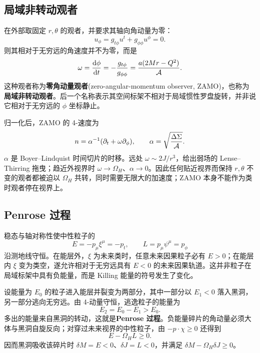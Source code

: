 \subsection{局域非转动观者}

在外部取固定 $r,\theta$ 的观者，并要求其轴向角动量为零：
\[
    u_\phi=g_{t\phi}u^t+g_{\phi\phi}u^\phi=0.
\]
则其相对于无穷远的角速度并不为零，而是
\begin{equation}\label{eq:kn-zamo-omega}
    \omega=\frac{\dd\phi}{\dd t}
      =-\frac{g_{t\phi}}{g_{\phi\phi}}
      =\frac{a(2Mr-Q^2)}{\mathcal A}.
\end{equation}
这种观者称为\textbf{零角动量观者}(zero-angular-momentum observer, ZAMO)，也称为\textbf{局域非转动观者}。后一个名称表示其空间标架不相对于局域惯性罗盘旋转，并非说它相对于无穷远的 $\phi$ 坐标静止。

归一化后，ZAMO 的 4-速度为
\begin{equation}\label{eq:kn-zamo}
    n=\alpha^{-1}(\partial_t+\omega\partial_\phi),
    \qquad
    \alpha=\sqrt{\frac{\Delta\Sigma}{\mathcal A}}.
\end{equation}
$\alpha$ 是 Boyer--Lindquist 时间切片的时移。远处 $\omega\sim2J/r^3$，给出弱场的 Lense--Thirring 拖曳；趋近外视界时 $\omega\to\Omega_H$、$\alpha\to0$。因此任何贴近视界而保持 $r,\theta$ 不变的观者都被迫以 $\Omega_H$ 共转，同时需要无限大的加速度；ZAMO 本身不能作为类时观者停在视界上。

\subsection{Penrose 过程}

稳态与轴对称性使中性粒子的
\[
    E=-p_\mu\xi^\mu=-p_t,
    \qquad L=p_\mu\psi^\mu=p_\phi
\]
沿测地线守恒。在能层外，$\xi$ 为未来类时，任意未来因果粒子必有 $E>0$；在能层内 $\xi$ 变为类空，遂允许相对于无穷远具有 $E<0$ 的未来因果轨道。这并非粒子在局域标架中具有负能量，而是 Killing 能量的符号发生了变化。

设能量为 $E_0$ 的粒子进入能层并裂变为两部分，其中一部分以 $E_1<0$ 落入黑洞，另一部分逃向无穷远。由 4-动量守恒，逃逸粒子的能量为
\[
    E_2=E_0-E_1>E_0.
\]
多出的能量来自黑洞的转动，这就是\textbf{Penrose 过程}。负能量碎片的角动量必须大体与黑洞自旋反向；对穿过未来视界的中性粒子，由 $-p\cdot\chi\geqslant0$ 还得到
\begin{equation}\label{eq:kn-horizon-inequality}
    E-\Omega_H L\geqslant0.
\end{equation}
因而黑洞吸收该碎片时 $\delta M=E<0$、$\delta J=L<0$，并满足 $\delta M-\Omega_H\delta J\geqslant0$。

